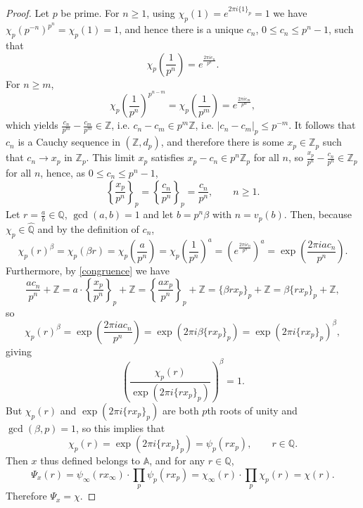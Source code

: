 \documentclass{article}
\theoremstyle{definition}
\begin{document}
\begin{proof}
Let $p$ be prime. For $n \geq 1$, using $\chi_p(1)=e^{2\pi i\{1\}_p}=1$ we have
$\chi_p(p^{-n})^{p^n} = \chi_p(1)=1$, and hence there is a unique
$c_n$, $0 \leq c_n \leq p^n-1$, such that
\[
\chi_p\left(\frac{1}{p^{n}}\right)=e^{\frac{2\pi i c_n}{p^n}}.
\]
For $n \geq m$,
\[
\chi_p\left(\frac{1}{p^{n}}\right)^{p^{n-m}} = \chi_p\left(\frac{1}{p^{m}}\right) = e^{\frac{2\pi i c_m}{p^m}},
\]
which yields $\frac{c_n}{p^m} - \frac{c_m}{p^m} \in \mathbb{Z}$, i.e. 
$c_n -c_m \in p^m \mathbb{Z}$, i.e. 
$|c_n-c_m|_p \leq p^{-m}$.
It follows that $c_n$ is a Cauchy sequence in $(\mathbb{Z},d_p)$, and therefore there is some
$x_p \in \mathbb{Z}_p$ such that  $c_n \to x_p$ in $\mathbb{Z}_p$. This limit $x_p$ satisfies
$x_p-c_n \in p^n \mathbb{Z}_p$ for all $n$, so $\frac{x_p}{p^n}-\frac{c_n}{p^n} \in \mathbb{Z}_p$
for all $n$, hence, as $0 \leq c_n \leq p^n-1$,
\begin{equation}
\left\{ \frac{x_p}{p^n} \right\}_p = \left\{ \frac{c_n}{p^n} \right\}_p=\frac{c_n}{p^n}, \qquad
n \geq 1.
\label{congruence}
\end{equation}                                         
Let $r=\frac{a}{b} \in \mathbb{Q}$, $\gcd(a,b)=1$ and let $b=p^n \beta$ with
$n=v_p(b)$. Then, because $\chi_p \in \widehat{\mathbb{Q}}$ and by the definition of $c_n$,
\[
\chi_p(r)^\beta = \chi_p(\beta r) = \chi_p\left( \frac{a}{p^n} \right) = 
\chi_p\left(\frac{1}{p^n} \right)^a= \left( e^{\frac{2\pi i c_n}{p^n}} \right)^a= 
\exp\left( \frac{2\pi i a c_n}{p^n} \right).
\]
Furthermore, by \eqref{congruence} we have
\[
\frac{ac_n}{p^n} +\mathbb{Z}= a\cdot \left\{\frac{x_p}{p^n} \right\}_p +\mathbb{Z}=
 \left\{ \frac{ax_p}{p^n} \right\}_p +\mathbb{Z}
= \{ \beta rx_p  \}_p +\mathbb{Z}= 
\beta \{rx_p\}_p + \mathbb{Z},
\]
so
\[
\chi_p(r)^\beta=
\exp\left( \frac{2\pi i a c_n}{p^n} \right)
=\exp(2\pi i \beta \{rx_p\}_p)
=\exp(2\pi i \{rx_p\}_p)^\beta,
\]
giving
\[
\left( \frac{\chi_p(r)}{\exp(2\pi i\{rx_p\}_p)} \right)^\beta=1.
\]
But $\chi_p(r)$ and $\exp(2\pi i\{rx_p\}_p)$ are both $p$th roots of unity and $\gcd(\beta,p)=1$, so this implies that
\[
\chi_p(r)=\exp(2\pi i\{rx_p\}_p) = \psi_p(rx_p), \qquad r \in \mathbb{Q}.
\]
Then $x$ thus defined belongs to $\mathbb{A}$, and for any $r \in \mathbb{Q}$,
\[
\Psi_x(r) = \psi_\infty(rx_\infty) \cdot \prod_p \psi_p(rx_p)
=\chi_\infty(r) \cdot \prod_p \chi_p(r)
=\chi(r).
\]
Therefore $\Psi_x = \chi$. 


\end{proof}
\end{document}
